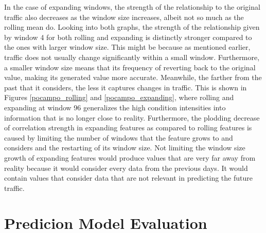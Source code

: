 In the case of expanding windows, the strength of the relationship to the original traffic also decreases as the window size increases, albeit not so much as the rolling mean do. Looking into both graphs, the strength of the relationship given by window 4 for both rolling and expanding is distinctly stronger compared to the ones with larger window size. This might be because as mentioned earlier, traffic does not usually change significantly within a small window. Furthermore, a smaller window size means that its frequency of reverting back to the original value, making its generated value more accurate. Meanwhile, the farther from the past that it considers, the less it captures changes in traffic. This is shown in Figures \ref{pocampo_rolling} and \ref{pocampo_expanding}, where rolling and expanding at window 96 generalizes the high condition intensities into information that is no longer close to reality. Furthermore, the plodding decrease of correlation strength in expanding features as compared to rolling features is caused by limiting the number of windows that the feature grows to and considers and the restarting of its window size. Not limiting the window size growth of expanding features would produce values that are very far away from reality because it would consider every data from the previous days. It would contain values that consider data that are not relevant in predicting the future traffic.



























\pagebreak[4]
\section{Predicion Model Evaluation}

